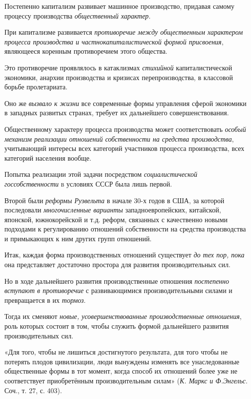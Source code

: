 \documentclass[a4paper,14pt,russian]{extreport}
\begin{document}
Постепенно капитализм развивает машинное производство, придавая самому процессу производства \emph{общественный характер}.

При капитализме развивается \emph{противоречие между общественным характером процесса производства и частнокапиталистической формой присвоения}, являющееся коренным противоречием этого общества.

Это противоречие проявлялось в катаклизмах \emph{стихийной} капиталистической экономики, анархии производства и кризисах перепроизводства, в классовой борьбе пролетариата.

Оно же \emph{вызвало к жизни} все современные формы управления сферой экономики в западных развитых странах, требует их дальнейшего совершенствования.

Общественному характеру процесса производства может соответствовать \emph{особый механизм реализации отношений собственности на средства производства}, учитывающий интересы всех категорий участников процесса производства, всех категорий населения вообще.

Попытка реализации этой задачи посредством \emph{социалистической госсобственности} \textsc{в} условиях СССР была лишь первой.

Второй были \emph{реформы Рузвельта} в начале 30-х годов в США, за которой последовали \emph{многочисленные варианты} западноевропейских, китайской, японской, южнокорейской и т.д. реформ, связанных с качественно новыми подходами к регулированию отношений собственности на средства производства и примыкающих к ним других групп отношений.

Итак, каждая форма производственных отношений существует \emph{до тех пор, пока} она представляет достаточно простора для развития производительных сил.

Но в ходе дальнейшего развития производственные отношения \emph{постепенно вступают в противоречие} с развивающимися производительными силами и превращается в их \emph{тормоз}.

Тогда их сменяют \emph{новые, усовершенствованные производственные отношения}, роль которых состоит в том, чтобы служить формой дальнейшего развития производительных сил.

«Для того, чтобы не лишиться достигнутого результата, для того чтобы не потерять плодов цивилизации, люди вынуждены изменять все унаследованные общественные формы в тот момент, когда способ их отношений более уже не соответствует приобретённым производительным силам» (\emph{К. Маркс и Ф.Энгельс}. Соч., т. 27, с. 403).
\end{document}
